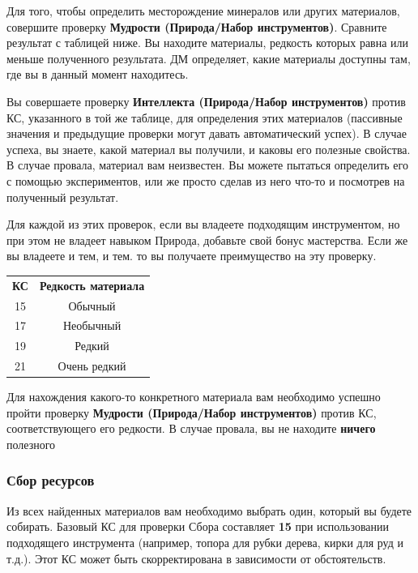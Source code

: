 \documentclass[a4paper, 9pt, twocolumn]{book}
\begin{document}
	Для того, чтобы определить месторождение минералов или других материалов, совершите проверку \textbf{Мудрости (Природа/Набор инструментов)}. Сравните результат с таблицей ниже. Вы находите материалы, редкость которых равна или меньше полученного результата. ДМ определяет, какие материалы доступны там, где вы в данный момент находитесь.
	
	Вы совершаете проверку \textbf{Интеллекта (Природа/Набор инструментов)} против КС, указанного в той же таблице, для определения этих материалов (пассивные значения и предыдущие проверки могут давать автоматический успех). В случае успеха, вы знаете, какой материал вы получили, и каковы его полезные свойства. В случае провала, материал вам неизвестен. Вы можете пытаться определить его с помощью экспериментов, или же просто сделав из него что-то и посмотрев на полученный результат.
	
	Для каждой из этих проверок, если вы владеете подходящим инструментом, но при этом не владеет навыком Природа, добавьте свой бонус мастерства. Если же вы владеете и тем, и тем. то вы получаете преимущество на эту проверку.
	
	\begin{table}[H]
		
		\centering
		
		\begin{tabularx}{0.8\linewidth}{c C}
			\textbf{КС} & \textbf{Редкость материала} \\
			15 & Обычный \\
			17 & Необычный \\
			19 & Редкий \\
			21 & Очень редкий \\
		\end{tabularx}
	\end{table}
	
	
	Для нахождения какого-то конкретного материала вам необходимо успешно пройти проверку \textbf{Мудрости (Природа/Набор инструментов)} против КС, соответствующего его редкости. В случае провала, вы не находите \textbf{ничего} полезного
	
	\subsubsection{Сбор ресурсов}
	
	Из всех найденных материалов вам необходимо выбрать один, который вы будете собирать. Базовый КС для проверки Сбора составляет \textbf{15} при использовании подходящего инструмента (например, топора для рубки дерева, кирки для руд и т.д.). Этот КС может быть скорректирована в зависимости от обстоятельств.
	
\end{document}

